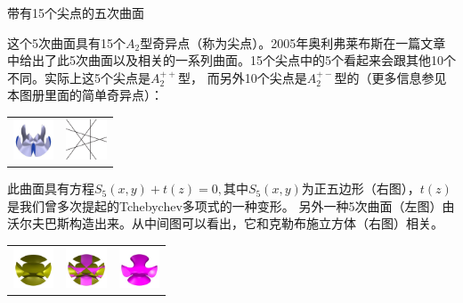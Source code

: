 ﻿\begin{surferPage}{带有15个尖点的五次曲面}


这个5次曲面具有15个$A_2$型奇异点（称为尖点）。2005年奥利弗莱布斯在一篇文章中给出了此5次曲面以及相关的一系列曲面。15个尖点中的5个看起来会跟其他10个不同。实际上这5个尖点是$A_2^{++}$型，
而另外10个尖点是$A_2^{+-}$型的（更多信息参见本图册里面的简单奇异点）：
     \vspace*{-0.3em}
    \begin{center}
      \begin{tabular}{c@{\qquad}c}
        \includegraphics[height=1.2cm]{./../../common/images/dessins_quint_15a2}
        &
        \includegraphics[height=1.2cm]{./../../common/images/rp5.pdf}
      \end{tabular}
    \end{center}
    \vspace*{-0.3em}

此曲面具有方程$S_5(x,y) + t(z)=0,$其中$S_5(x,y)$为正五边形（右图），$t(z)$是我们曾多次提起的Tchebychev多项式的一种变形。
另外一种5次曲面（左图）由沃尔夫巴斯构造出来。从中间图可以看出，它和克勒布施立方体（右图）相关。 
    \vspace*{-0.3em}
    \begin{center}
      \begin{tabular}{c@{\quad}c@{\quad}c}
        \includegraphics[height=1.2cm]{./../../common/images/barthquintic_green}
        &
        \includegraphics[height=1.2cm]{./../../common/images/barthquintic_clebschcubic}
        &
        \includegraphics[height=1.2cm]{./../../common/images/clebschcubic_pink}
      \end{tabular}
    \end{center}
    \vspace*{-0.3em}
\end{surferPage}

